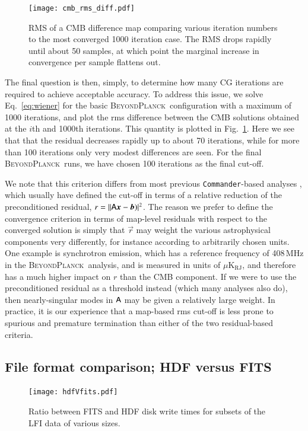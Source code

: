 \documentclass[twocolumn]{aa}
\def\commander{\texttt{Commander}}
\renewcommand{\b}[0]{\vec{b}}
\newcommand{\x}[0]{\vec{x}}
\newcommand{\A}[0]{\tens{A}}
\renewcommand{\r}[0]{\vec{r}}
\newcommand{\BP}{\textsc{BeyondPlanck}}
\begin{document}
\begin{figure}[t]
  \center
  \texttt{[image: cmb\_rms\_diff.pdf]}
  \caption{RMS of a CMB difference map comparing various iteration numbers to the most converged 1000 iteration case. The RMS drops rapidly until about 50 samples, at which point the marginal increase in convergence per sample flattens out.
  }\label{fig:rmsiterations}
\end{figure}

The final question is then, simply, to determine how many CG
iterations are required to achieve acceptable accuracy. To address
this issue, we solve Eq.~\eqref{eq:wiener} for the basic
\BP\ configuration \citep{BP01} with a maximum of 1000 iterations, and
plot the rms difference between the CMB solutions obtained at the
$i$th and 1000th iterations. This quantity is plotted in
Fig.~\ref{fig:rmsiterations}. Here we see that that the residual
decreases rapidly up to about 70 iterations, while for more than 100
iterations only very modest differences are seen. For the final
\BP\ runs, we have chosen 100 iterations as the final cut-off.

We note that this criterion differs from most previous
\commander-based analyses \citep[e.g.,][]{planck2014-a12}, which
usually have defined the cut-off in terms of a relative reduction of
the preconditioned residual, $r = ||\A\x-\b)|^2$. The reason we prefer
to define the convergence criterion in terms of map-level residuals
with respect to the converged solution is simply that $\r$ may weight
the various astrophysical components very differently, for instance
according to arbitrarily chosen units. One example is synchrotron
emission, which has a reference frequency of 408\,MHz in the
\BP\ analysis, and is measured in units of
$\mu\textrm{K}_{\mathrm{RJ}}$, and therefore has a much higher impact
on $r$ than the CMB component. If we were to use the preconditioned
residual as a threshold instead (which many analyses also do), then
nearly-singular modes in $\A$ may be given a relatively large
weight. In practice, it is our experience that a map-based rms cut-off
is less prone to spurious and premature termination than either of the two
residual-based criteria.

\subsection{File format comparison; HDF versus FITS}

\begin{figure}[t]
  \center
  \texttt{[image: hdfVfits.pdf]}
  \caption{Ratio between FITS and HDF disk write times for subsets of
    the LFI data of various sizes. 
  }\label{fig:hdfVfits}
\end{figure}
\end{document}
